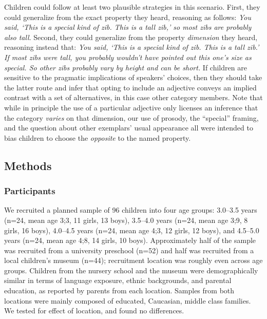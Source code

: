 \documentclass[man]{apa2}
\begin{document}
Children could follow at least two plausible strategies in this scenario. First, they could generalize from the exact property they heard, reasoning as follows: \emph{You said, `This is a special kind of zib. This is a tall zib,' so most zibs are probably also tall}. Second, they could generalize from the property \emph{dimension} they heard, reasoning instead that: \emph{You said, `This is a special kind of zib. This is a tall zib.' If most zibs were tall, you probably wouldn't have pointed out this one's size as special. So other zibs probably vary by height and can be short.} If children are sensitive to the pragmatic implications of speakers' choices, then they should take the latter route and infer that opting to include an adjective conveys an implied contrast with a set of alternatives, in this case other category members. Note that while in principle the use of a particular adjective only licenses an inference that the category \emph{varies} on that dimension, our use of prosody, the ``special'' framing, and the question about other exemplars' usual appearance all were intended to bias children to choose the \emph{opposite} to the named property.


\subsection{Methods}

\subsubsection{Participants}

We recruited a planned sample of 96 children into four age groups: 3.0--3.5 years (n=24, mean age 3;3, 11 girls, 13 boys), 3.5--4.0 years (n=24, mean age 3;9, 8 girls, 16 boys), 4.0--4.5 years (n=24, mean age 4;3, 12 girls, 12 boys), and 4.5--5.0 years (n=24, mean age 4;8, 14 girls, 10 boys).  Approximately half of the sample was recruited from a university preschool (n=52) and half was recruited from a local children's museum (n=44); recruitment location was roughly even across age groups. Children from the nursery school and the museum were demographically similar in terms of language exposure, ethnic backgrounds, and parental education, as reported by parents from each location. Samples from both locations were mainly composed of educated, Caucasian, middle class families.  We tested for effect of location, and found no differences.
\end{document}
